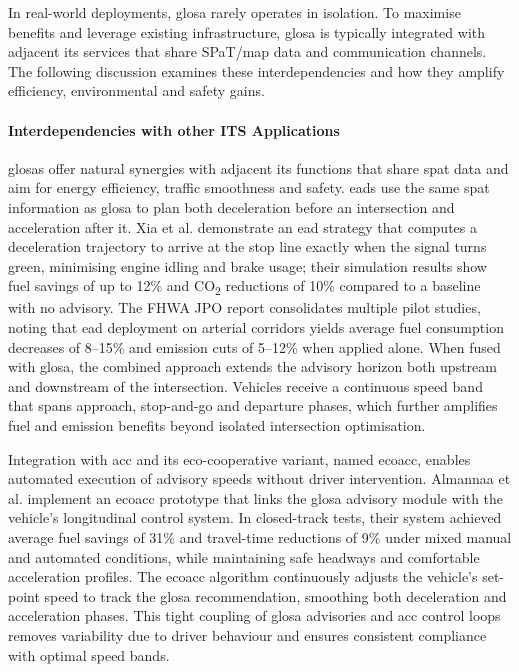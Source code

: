 \mynewline
In real-world deployments, \ac{glosa} rarely operates in isolation. To maximise benefits and leverage existing infrastructure, \ac{glosa} is typically integrated with adjacent \ac{its} services that share SPaT/\ac{map} data and communication channels. The following discussion examines these interdependencies and how they amplify efficiency, environmental and safety gains.

\paragraph{Interdependencies with other ITS Applications}

\acp{glosa} offer natural synergies with adjacent \ac{its} functions that share \ac{spat} data and aim for energy efficiency, traffic smoothness and safety. \acp{ead} use the same \ac{spat} information as \ac{glosa} to plan both deceleration before an intersection and acceleration after it. Xia et al. \cite{Xia2014} demonstrate an \ac{ead} strategy that computes a deceleration trajectory to arrive at the stop line exactly when the signal turns green, minimising engine idling and brake usage; their simulation results show fuel savings of up to 12\% and CO\textsubscript{2} reductions of 10\% compared to a baseline with no advisory. The FHWA JPO report \cite{FHWA2016} consolidates multiple pilot studies, noting that \ac{ead} deployment on arterial corridors yields average fuel consumption decreases of 8–15\% and emission cuts of 5–12\% when applied alone. When fused with \ac{glosa}, the combined approach extends the advisory horizon both upstream and downstream of the intersection. Vehicles receive a continuous speed band that spans approach, stop-and-go and departure phases, which further amplifies fuel and emission benefits beyond isolated intersection optimisation.

Integration with \ac{acc} and its eco-cooperative variant, named \ac{ecoacc}, enables automated execution of advisory speeds without driver intervention. Almannaa et al. \cite{Almannaa2019} implement an \ac{ecoacc} prototype that links the \ac{glosa} advisory module with the vehicle’s longitudinal control system. In closed-track tests, their system achieved average fuel savings of 31\% and travel-time reductions of 9\% under mixed manual and automated conditions, while maintaining safe headways and comfortable acceleration profiles. The \ac{ecoacc} algorithm continuously adjusts the vehicle’s set-point speed to track the \ac{glosa} recommendation, smoothing both deceleration and acceleration phases. This tight coupling of \ac{glosa} advisories and \ac{acc} control loops removes variability due to driver behaviour and ensures consistent compliance with optimal speed bands.

